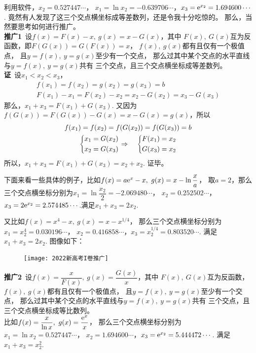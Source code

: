 \begin{enumerate}[label={【\textbf{例\thechapter.\arabic*}】},
 leftmargin=\inteval{\myenumleftmargin}pt,
 itemsep=\inteval{\myenumitempsep}pt,
 itemindent=\inteval{\myenumitemindent}pt]
利用软件，$ x_2=0.527447\cdots $，
$ x_1=\ln x_2=-0.639706\cdots $，$ x_3=\mathrm{e}^{x_2}=1.694600\cdots $. 
竟然有人发现了这三个交点横坐标成等差数列，还是令我十分吃惊的。
那么，当然要思考如何进行推广。\\ 
\textbf{推广1}\ 设$ f(x)=F(x)-x,\ g(x)=x-G(x) $，其中
$ F(x),\ G(x) $互为反函数，即$ F(G(x))=G(F(x))=x $，
$ f(x),\ g(x) $都有且仅有一个极值点，
且$ y=f(x),\ y=g(x) $至少有一个交点，
那么过其中某个交点的水平直线与$ y=f(x),\ y=g(x) $共有
三个交点，且三个交点横坐标成等差数列。\\
\textbf{证}\ 设$ x_1<x_2<x_3 $，
\begin{gather*}
    f(x_1)=f(x_2)=g(x_2)=g(x_3)=b \\
    F(x_1)-x_1=F(x_2)-x_2=x_2-G(x_2)=x_3-G(x_3) 
\end{gather*}
那么，$ x_1+x_3=F(x_1)+G(x_3) $. 又因为
$ f(G(x))=F(G(x))-G(x)=x-G(x)=g(x) $，所以
\begin{gather*}
    f(x_1)=f(x_2)=f(G(x_2))=f(G(x_3))=b \\
    \begin{dcases}
        x_1=G(x_2) \\
        x_2=G(x_3)
    \end{dcases} \Rightarrow \quad 
    \begin{dcases}
        F(x_1)=x_2 \\
        G(x_3)=x_2
    \end{dcases} 
\end{gather*}
所以，$ x_1+x_3=F(x_1)+G(x_3)=x_2+x_2 $. 证毕。

下面来看一些具体的例子，比如$ f(x)=a\e^x-x,\ g(x)=x-\ln\dfrac{x}{a} $，
取$ a=2 $，那么三个交点横坐标分别为$ x_1=\ln\dfrac{x_2}{2}=-2.069480\cdots $，
$ x_2=0.252502\cdots $，$ x_3=2\mathrm{e}^{x_2}=2.574485\cdots $.满足$ x_1+x_3=2x_2 $.

又比如$ f(x)=x^4-x,\ g(x)=x-x^{1/4} $，
那么三个交点横坐标分别为$ x_1=x_2^4=0.030196\cdots $，
$ x_2=0.416858\cdots $，$ x_3=x_2^{1/4}=0.803520\cdots $.
满足$ x_1+x_3=2x_2 $. 图像如下：
\begin{figure}[!ht]
    \centering
    \texttt{[image: 2022新高考I卷推广]}
\end{figure}

\textbf{推广2}\ 设$ f(x)=\dfrac{x}{F(x)},\ g(x)=\dfrac{G(x)}{x} $，其中
$ F(x),\ G(x) $互为反函数，$ f(x),\ g(x) $都有且仅有一个极值点，
且$ y=f(x),\ y=g(x) $至少有一个交点，
那么过其中某个交点的水平直线与$ y=f(x),\ y=g(x) $共有
三个交点，且三个交点横坐标成等比数列。\\
比如$ f(x)=\dfrac{x}{\ln x},\ g(x)=\dfrac{\e^x}{x} $，
那么三个交点横坐标分别为$ x_1=\ln x_2=0.527447\cdots $，
$ x_2=1.694600\cdots $，$ x_3=\mathrm{e}^{x_2}=5.444472\cdots $.
满足$ x_1+x_3=x_2^2 $.


\end{enumerate}

